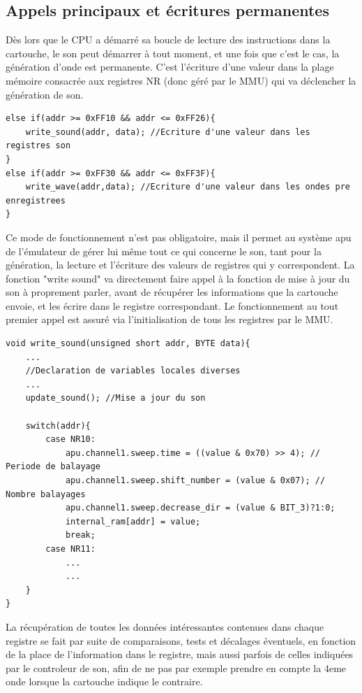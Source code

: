 \documentclass{report}
\begin{document}
\subsection{Appels principaux et écritures permanentes}
Dès lors que le CPU a démarré sa boucle de lecture des instructions dans la cartouche, le son peut démarrer à tout moment, et une fois que c'est le cas, la génération d'onde est permanente.
C'est l'écriture d'une valeur dans la plage mémoire consacrée aux registres NR (donc géré par le MMU) qui va déclencher la génération de son.
\begin{lstlisting}
else if(addr >= 0xFF10 && addr <= 0xFF26){
	write_sound(addr, data); //Ecriture d'une valeur dans les registres son
}
else if(addr >= 0xFF30 && addr <= 0xFF3F){
	write_wave(addr,data); //Ecriture d'une valeur dans les ondes pre enregistrees
}
\end{lstlisting}
Ce mode de fonctionnement n'est pas obligatoire, mais il permet au système apu de l'émulateur de gérer lui même tout ce qui concerne le son, tant pour la génération, la lecture et l'écriture des valeurs de registres qui y correspondent.
La fonction "write sound" va directement faire appel à la fonction de mise à jour du son à proprement parler, avant de récupérer les informations que la cartouche envoie, et les écrire dans le registre correspondant. Le fonctionnement au tout premier appel est assuré via l'initialisation de tous les registres par le MMU.
\begin{lstlisting}
void write_sound(unsigned short addr, BYTE data){
	...
	//Declaration de variables locales diverses
	...
	update_sound(); //Mise a jour du son

	switch(addr){
		case NR10:
			apu.channel1.sweep.time = ((value & 0x70) >> 4); // Periode de balayage
			apu.channel1.sweep.shift_number = (value & 0x07); // Nombre balayages
			apu.channel1.sweep.decrease_dir = (value & BIT_3)?1:0;
			internal_ram[addr] = value;
			break;
		case NR11:
			...
			...
	}
}
\end{lstlisting}
La récupération de toutes les données intéressantes contenues dans chaque registre se fait par suite de comparaisons, tests et décalages éventuels, en fonction de la place de l'information dans le registre, mais aussi 
parfois de celles indiquées par le controleur de son, afin de ne pas par exemple prendre en compte la 4eme onde lorsque la cartouche indique le contraire.
\end{document}
